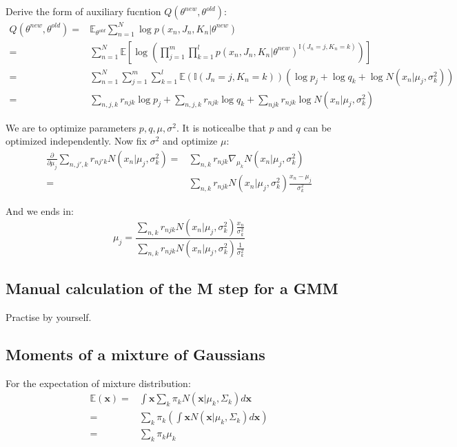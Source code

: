 \documentclass[UTF8]{ctexart}
\begin{document}
Derive the form of auxiliary fucntion $Q(\theta^{new},\theta^{old})$:
\begin{align}
Q(\theta^{new},\theta^{old})=&\mathbb{E}_{\theta^{old}}\sum_{n=1}^{N}\log p(x_{n},J_{n},K_{n}|\theta^{new})\nonumber \\
=&\sum_{n=1}^{N}\mathbb{E}[\log(\prod_{j=1}^{m}\prod_{k=1}^{l} p(x_{n},J_{n},K_{n}|\theta^{new})^{\mathbb{I}(J_{n}=j,K_{n}=k)} )]\nonumber \\
=&\sum_{n=1}^{N}\sum_{j=1}^{m}\sum_{k=1}^{l}\mathbb{E}(\mathbb{I}(J_{n}=j,K_{n}=k))(\log p_{j} + \log q_{k} + \log N(x_{n}|\mu_{j},\sigma^{2}_{k}))\nonumber \\
=&\sum_{n,j,k}r_{njk}\log p_{j} + \sum_{n,j,k}r_{njk}\log q_{k} + \sum_{njk}r_{njk}\log N(x_{n}|\mu_{j},\sigma^{2}_{k})\nonumber
\end{align}

We are to optimize parameters $p,q,\mu,\sigma^{2}$. It is noticealbe that $p$ and $q$ can be optimized independently. Now fix $\sigma^{2}$ and optimize $\mu$:
\begin{align}
\frac{\partial}{\partial \mu_{j}}\sum_{n,j',k}r_{nj'k}N(x_{n}|\mu_{j},\sigma^{2}_{k})=&\sum_{n,k}r_{njk}\nabla_{\mu_{k}}N(x_{n}|\mu_{j},\sigma^{2}_{k})\nonumber \\
=&\sum_{n,k}r_{njk}N(x_{n}|\mu_{j},\sigma^{2}_{k})\frac{x_{n}-\mu_{j}}{\sigma^{2}_{k}}\nonumber
\end{align}

And we ends in:
$$\mu_{j}=\frac{\sum_{n,k}r_{njk}N(x_{n}|\mu_{j},\sigma^{2}_{k})\frac{x_{n}}{\sigma^{2}_{k}}} { \sum_{n,k}r_{njk}N(x_{n}|\mu_{j},\sigma^{2}_{k})\frac{1}{\sigma^{2}_{k}}}$$

\subsection{Manual calculation of the M step for a GMM}
Practise by yourself.

\subsection{Moments of a mixture of Gaussians}
For the expectation of mixture distribution:
\begin{align}
\mathbb{E}(\textbf{x})=&\int\textbf{x}\sum_{k}\pi_{k}N(\textbf{x}|\mu_{k},\Sigma_{k})d\textbf{x}\nonumber \\
=&\sum_{k}\pi_{k}(\int\textbf{x}N(\textbf{x}|\mu_{k},\Sigma_{k})d\textbf{x})\nonumber \\
=&\sum_{k}\pi_{k}\mu_{k}\nonumber
\end{align}
\end{document}
